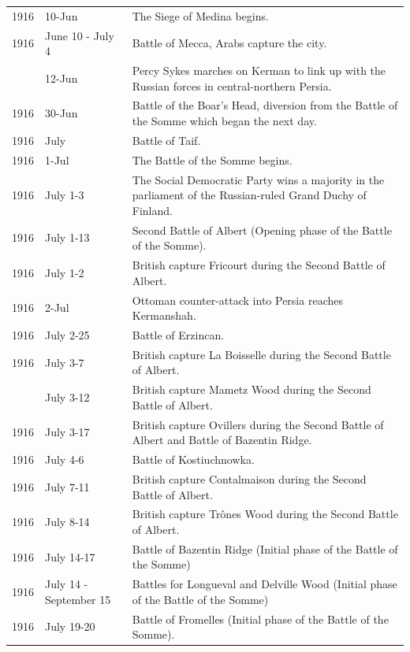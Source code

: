\documentclass[
  openany]{book}
\begin{document}
\begin{longtable}[t]{rl>{\raggedright\arraybackslash}p{22em}}
1916 & 10-Jun & The Siege of Medina begins.\\
\rowcolor{gray!6}  1916 & June 10 - July 4 & Battle of Mecca, Arabs capture the city.\\
\addlinespace
1916 & 12-Jun & Percy Sykes marches on Kerman to link up with the Russian forces in central-northern Persia.\\
\rowcolor{gray!6}  1916 & 30-Jun & Battle of the Boar's Head, diversion from the Battle of the Somme which began the next day.\\
1916 & July & Battle of Taif.\\
\rowcolor{gray!6}  1916 & 1-Jul & The Battle of the Somme begins.\\
1916 & July 1-3 & The Social Democratic Party wins a majority in the parliament of the Russian-ruled Grand Duchy of Finland.\\
\addlinespace
\rowcolor{gray!6}  1916 & July 1-13 & Second Battle of Albert (Opening phase of the Battle of the Somme).\\
1916 & July 1-2 & British capture Fricourt during the Second Battle of Albert.\\
\rowcolor{gray!6}  1916 & 2-Jul & Ottoman counter-attack into Persia reaches Kermanshah.\\
1916 & July 2-25 & Battle of Erzincan.\\
\rowcolor{gray!6}  1916 & July 3-7 & British capture La Boisselle during the Second Battle of Albert.\\
\addlinespace
1916 & July 3-12 & British capture Mametz Wood during the Second Battle of Albert.\\
\rowcolor{gray!6}  1916 & July 3-17 & British capture Ovillers during the Second Battle of Albert and Battle of Bazentin Ridge.\\
1916 & July 4-6 & Battle of Kostiuchnowka.\\
\rowcolor{gray!6}  1916 & July 7-11 & British capture Contalmaison during the Second Battle of Albert.\\
1916 & July 8-14 & British capture Trônes Wood during the Second Battle of Albert.\\
\addlinespace
\rowcolor{gray!6}  1916 & July 14-17 & Battle of Bazentin Ridge (Initial phase of the Battle of the Somme)\\
1916 & July 14 - September 15 & Battles for Longueval and Delville Wood (Initial phase of the Battle of the Somme)\\
\rowcolor{gray!6}  1916 & July 19-20 & Battle of Fromelles (Initial phase of the Battle of the Somme).\\

\end{longtable}
\end{document}
